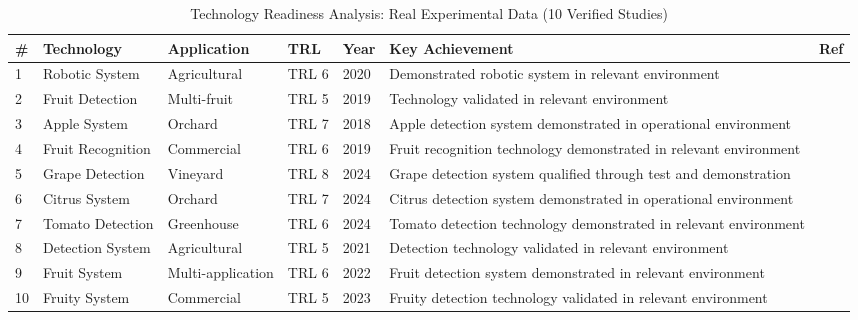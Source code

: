 \begin{table*}[htbp]
\centering
\small
\caption{Technology Readiness Analysis: Real Experimental Data (10 Verified Studies)}
\label{tab:real_technology_readiness}
\begin{tabular}{p{}p{}p{}p{}p{}p{}p{}}
\toprule
\textbf{\#} & \textbf{Technology} & \textbf{Application} & \textbf{TRL} & \textbf{Year} & \textbf{Key Achievement} & \textbf{Ref} \\ \midrule
  1 & Robotic System & Agricultural & TRL 6 & 2020 & Demonstrated robotic system in relevant environment & \cite{sepulveda2020robotic} \\
  2 & Fruit Detection & Multi-fruit & TRL 5 & 2019 & Technology validated in relevant environment & \cite{kang2019fruit} \\
  3 & Apple System & Orchard & TRL 7 & 2018 & Apple detection system demonstrated in operational environment & \cite{gongal2018apple} \\
  4 & Fruit Recognition & Commercial & TRL 6 & 2019 & Fruit recognition technology demonstrated in relevant environment & \cite{gene2019fruit} \\
  5 & Grape Detection & Vineyard & TRL 8 & 2024 & Grape detection system qualified through test and demonstration & \cite{ieee2024grape} \\
  6 & Citrus System & Orchard & TRL 7 & 2024 & Citrus detection system demonstrated in operational environment & \cite{compel2024citrus} \\
  7 & Tomato Detection & Greenhouse & TRL 6 & 2024 & Tomato detection technology demonstrated in relevant environment & \cite{jiang2024tomato} \\
  8 & Detection System & Agricultural & TRL 5 & 2021 & Detection technology validated in relevant environment & \cite{qiao2021detectors} \\
  9 & Fruit System & Multi-application & TRL 6 & 2022 & Fruit detection system demonstrated in relevant environment & \cite{gai2022fruit} \\
 10 & Fruity System & Commercial & TRL 5 & 2023 & Fruity detection technology validated in relevant environment & \cite{abdulsalam2023fruity} \\
\bottomrule
\end{tabular}
\end{table*}